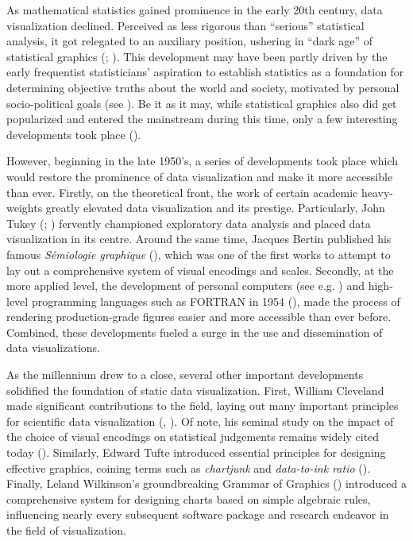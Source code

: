 \documentclass[
]{book}
\theoremstyle{definition}
\theoremstyle{definition}
\theoremstyle{definition}
\theoremstyle{definition}
\theoremstyle{remark}
\begin{document}
As mathematical statistics gained prominence in the early 20th century, data visualization declined. Perceived as less rigorous than ``serious'' statistical analysis, it got relegated to an auxiliary position, ushering in ``dark age'' of statistical graphics (; ). This development may have been partly driven by the early frequentist statisticians' aspiration to establish statistics as a foundation for determining objective truths about the world and society, motivated by personal socio-political goals (see ). Be it as it may, while statistical graphics also did get popularized and entered the mainstream during this time, only a few interesting developments took place ().

However, beginning in the late 1950's, a series of developments took place which would restore the prominence of data visualization and make it more accessible than ever. Firstly, on the theoretical front, the work of certain academic heavy-weights greatly elevated data visualization and its prestige. Particularly, John Tukey (; ) fervently championed exploratory data analysis and placed data visualization in its centre. Around the same time, Jacques Bertin published his famous \emph{Sémiologie graphique} (), which was one of the first works to attempt to lay out a comprehensive system of visual encodings and scales. Secondly, at the more applied level, the development of personal computers (see e.g. ) and high-level programming languages such as FORTRAN in 1954 (), made the process of rendering production-grade figures easier and more accessible than ever before. Combined, these developments fueled a surge in the use and dissemination of data visualizations.

As the millennium drew to a close, several other important developments solidified the foundation of static data visualization. First, William Cleveland made significant contributions to the field, laying out many important principles for scientific data visualization (, ). Of note, his seminal study on the impact of the choice of visual encodings on statistical judgements remains widely cited today (). Similarly, Edward Tufte introduced essential principles for designing effective graphics, coining terms such as \emph{chartjunk} and \emph{data-to-ink ratio} (). Finally, Leland Wilkinson's groundbreaking Grammar of Graphics () introduced a comprehensive system for designing charts based on simple algebraic rules, influencing nearly every subsequent software package and research endeavor in the field of visualization.
\end{document}
